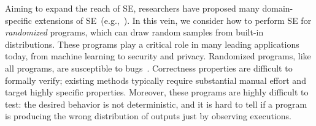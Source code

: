 \documentclass[acmsmall,review,anonymous]{acmart}\settopmatter{printfolios=true,printccs=false,printacmref=false}
\begin{document}
Aiming to expand the reach of SE, researchers have proposed many domain-specific
extensions of SE~(e.g.,~\citet{geldenhuys_2012, filieri_2013, borges_2014,
  p4wn_2021, farina_2019, raimondas_2010, raimondas_2011, adam_2012}). In this
vein, we consider how to perform SE for \emph{randomized} programs, which can
draw random samples from built-in distributions. These programs play a critical
role in many leading applications today, from machine learning to security and
privacy. Randomized programs, like all programs, are susceptible to
bugs~\citep{axprof_2019}.  Correctness properties are difficult to formally
verify; existing methods typically require substantial manual effort and target
highly specific properties. Moreover, these programs are highly difficult to
test: the desired behavior is not deterministic, and it is hard to tell if a
program is producing the wrong distribution of outputs just by observing
executions.
\end{document}
